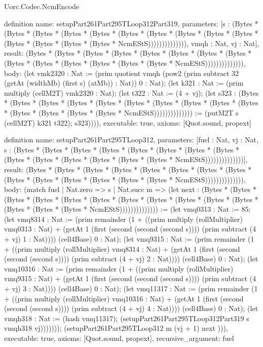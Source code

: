 \begin{lexlean}{Uorc.Codec.NcmEncode}
\begin{semanticmodule}
definition{
  name: setupPart261Part295TLoop312Part319,
  parameters: [s : (Bytes * (Bytes * (Bytes * (Bytes * (Bytes * (Bytes * (Bytes * (Bytes * (Bytes * (Bytes * (Bytes * (Bytes * (Bytes * (Bytes * NcmEStS)))))))))))))), vmqh : Nat, vj : Nat],
  result: (Bytes * (Bytes * (Bytes * (Bytes * (Bytes * (Bytes * (Bytes * (Bytes * (Bytes * (Bytes * (Bytes * (Bytes * (Bytes * (Bytes * NcmEStS)))))))))))))),
  body: (let vmk2320 : Nat := (prim quotient vmqh (pow2 (prim subtract 32 (getAt (widthMb) (first s) (atMb)) : Nat)) 0 : Nat); (let k321 : Nat := (prim multiply (cellM2T) vmk2320 : Nat); (let t322 : Nat := (4 + vj); (let s323 : (Bytes * (Bytes * (Bytes * (Bytes * (Bytes * (Bytes * (Bytes * (Bytes * (Bytes * (Bytes * (Bytes * (Bytes * (Bytes * (Bytes * NcmEStS)))))))))))))) := (putM2T s (cellM2T) k321 t322); s323)))),
  executable: true,
  axioms: [Quot.sound, propext]
}

definition{
  name: setupPart261Part295TLoop312,
  parameters: [fuel : Nat, vj : Nat, s : (Bytes * (Bytes * (Bytes * (Bytes * (Bytes * (Bytes * (Bytes * (Bytes * (Bytes * (Bytes * (Bytes * (Bytes * (Bytes * (Bytes * NcmEStS))))))))))))))],
  result: (Bytes * (Bytes * (Bytes * (Bytes * (Bytes * (Bytes * (Bytes * (Bytes * (Bytes * (Bytes * (Bytes * (Bytes * (Bytes * (Bytes * NcmEStS)))))))))))))),
  body: (match fuel
    | Nat.zero => s
    | Nat.succ m => (let next : (Bytes * (Bytes * (Bytes * (Bytes * (Bytes * (Bytes * (Bytes * (Bytes * (Bytes * (Bytes * (Bytes * (Bytes * (Bytes * (Bytes * NcmEStS)))))))))))))) := (let vmq0313 : Nat := 85; (let vmq8314 : Nat := (prim remainder (1 + ((prim multiply (rollMultiplier) vmq0313 : Nat) + (getAt 1 (first (second (second (second s)))) (prim subtract (4 + vj) 1 : Nat)))) (cell4Base) 0 : Nat); (let vmq9315 : Nat := (prim remainder (1 + ((prim multiply (rollMultiplier) vmq8314 : Nat) + (getAt 1 (first (second (second (second s)))) (prim subtract (4 + vj) 2 : Nat)))) (cell4Base) 0 : Nat); (let vmq10316 : Nat := (prim remainder (1 + ((prim multiply (rollMultiplier) vmq9315 : Nat) + (getAt 1 (first (second (second (second s)))) (prim subtract (4 + vj) 3 : Nat)))) (cell4Base) 0 : Nat); (let vmq11317 : Nat := (prim remainder (1 + ((prim multiply (rollMultiplier) vmq10316 : Nat) + (getAt 1 (first (second (second (second s)))) (prim subtract (4 + vj) 4 : Nat)))) (cell4Base) 0 : Nat); (let vmqh318 : Nat := (hash vmq11317); (setupPart261Part295TLoop312Part319 s vmqh318 vj))))))); (setupPart261Part295TLoop312 m (vj + 1) next ))),
  executable: true,
  axioms: [Quot.sound, propext],
  recursive_argument: fuel
}


\end{semanticmodule}
\end{lexlean}
